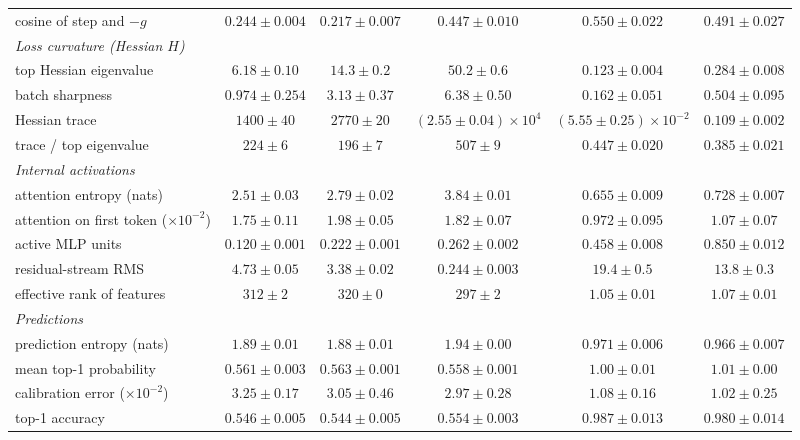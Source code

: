 \begin{center}
\begin{minipage}{\linewidth}
\begin{tabular}{@{}l|ccc|cc@{}}
cosine of step and $-g$ & $0.244 \pm 0.004$ & $0.217 \pm 0.007$ & $0.447 \pm 0.010$ & $0.550 \pm 0.022$ & $0.491 \pm 0.027$ \\
\emph{Loss curvature (Hessian $H$)} & & & & & \\
top Hessian eigenvalue & $6.18 \pm 0.10$ & $14.3 \pm 0.2$ & $50.2 \pm 0.6$ & {\boldmath\textbf{$0.123 \pm 0.004$}} & $0.284 \pm 0.008$ \\
batch sharpness & $0.974 \pm 0.254$ & $3.13 \pm 0.37$ & $6.38 \pm 0.50$ & {\boldmath\textbf{$0.162 \pm 0.051$}} & $0.504 \pm 0.095$ \\
Hessian trace & $1400 \pm 40$ & $2770 \pm 20$ & $(2.55 \pm 0.04){\times}10^{4}$ & {\boldmath\textbf{$(5.55 \pm 0.25){\times}10^{-2}$}} & {\boldmath\textbf{$0.109 \pm 0.002$}} \\
trace / top eigenvalue & $224 \pm 6$ & $196 \pm 7$ & $507 \pm 9$ & $0.447 \pm 0.020$ & $0.385 \pm 0.021$ \\
\emph{Internal activations} & & & & & \\
attention entropy (nats) & $2.51 \pm 0.03$ & $2.79 \pm 0.02$ & $3.84 \pm 0.01$ & $0.655 \pm 0.009$ & $0.728 \pm 0.007$ \\
attention on first token ($\times10^{-2}$) & $1.75 \pm 0.11$ & $1.98 \pm 0.05$ & $1.82 \pm 0.07$ & $0.972 \pm 0.095$ & $1.07 \pm 0.07$ \\
active MLP units & $0.120 \pm 0.001$ & $0.222 \pm 0.001$ & $0.262 \pm 0.002$ & $0.458 \pm 0.008$ & $0.850 \pm 0.012$ \\
residual-stream RMS & $4.73 \pm 0.05$ & $3.38 \pm 0.02$ & $0.244 \pm 0.003$ & {\boldmath\textbf{$19.4 \pm 0.5$}} & {\boldmath\textbf{$13.8 \pm 0.3$}} \\
effective rank of features & $312 \pm 2$ & $320 \pm 0$ & $297 \pm 2$ & $1.05 \pm 0.01$ & $1.07 \pm 0.01$ \\
\emph{Predictions} & & & & & \\
prediction entropy (nats) & $1.89 \pm 0.01$ & $1.88 \pm 0.01$ & $1.94 \pm 0.00$ & $0.971 \pm 0.006$ & $0.966 \pm 0.007$ \\
mean top-1 probability & $0.561 \pm 0.003$ & $0.563 \pm 0.001$ & $0.558 \pm 0.001$ & $1.00 \pm 0.01$ & $1.01 \pm 0.00$ \\
calibration error ($\times10^{-2}$) & $3.25 \pm 0.17$ & $3.05 \pm 0.46$ & $2.97 \pm 0.28$ & $1.08 \pm 0.16$ & $1.02 \pm 0.25$ \\
top-1 accuracy & $0.546 \pm 0.005$ & $0.544 \pm 0.005$ & $0.554 \pm 0.003$ & $0.987 \pm 0.013$ & $0.980 \pm 0.014$ \\

\end{tabular}
\end{minipage}
\end{center}
